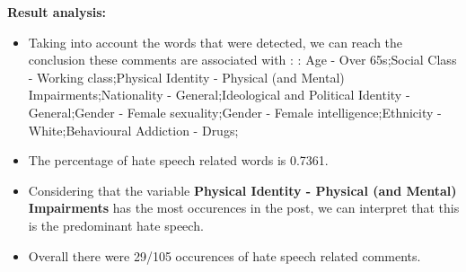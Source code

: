\documentclass[11pt]{article}
\begin{document}
\textbf{\Large Result analysis:}

\begin{itemize}\item Taking into account the words that were detected, we can reach the conclusion these comments are associated with : : Age - Over 65s;Social Class - Working class;Physical Identity - Physical (and Mental) Impairments;Nationality - General;Ideological and Political Identity - General;Gender - Female sexuality;Gender - Female intelligence;Ethnicity - White;Behavioural Addiction - Drugs;%

\item The percentage of hate speech related words is 0.7361.

\item Considering that the variable \textbf{Physical Identity - Physical (and Mental) Impairments} has the most occurences in the post, we can interpret that this is the predominant hate speech.

\item Overall there were 29/105 occurences of hate speech related comments.\end{itemize}
\end{document}
